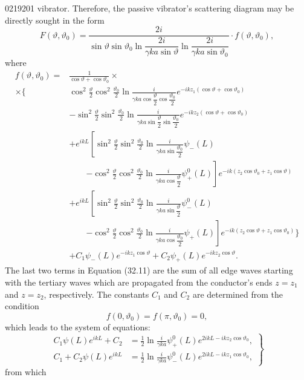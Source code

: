 \begin{scanpage}{0219}{201}
\noindent vibrator. Therefore, the passive vibrator's scattering diagram may be directly sought in the form
\[F(\vartheta,\vartheta_0)=\frac{2i}{\sin\vartheta\sin\vartheta_0\ln\dfrac{2i}{\gamma ka\sin\vartheta}\ln\dfrac{2i}{\gamma ka\sin\vartheta_0}}\cdot f(\vartheta,\vartheta_0),\tag{32.10}\]
where
\[\begin{aligned}
f(\vartheta,\vartheta_0)={}&\frac1{\cos\vartheta+\cos\vartheta_0}\times\\
\times\Biggl\{&\cos^2\frac\vartheta2\cos^2\frac{\vartheta_0}2\ln\frac{i}{\gamma ka\cos\dfrac\vartheta2\cos\dfrac{\vartheta_0}2}e^{-ikz_1(\cos\vartheta+\cos\vartheta_0)}\\
&-\sin^2\frac\vartheta2\sin^2\frac{\vartheta_0}2\ln\frac{i}{\gamma ka\sin\dfrac\vartheta2\sin\dfrac{\vartheta_0}2}e^{-ikz_2(\cos\vartheta+\cos\vartheta_0)}\\
&+e^{ikL}\left[\sin^2\frac\vartheta2\sin^2\frac{\vartheta_0}2\ln\frac{i}{\gamma ka\sin\dfrac{\vartheta_0}2}\psi_-(L)\right.\\
&\qquad\left.-\cos^2\frac\vartheta2\cos^2\frac{\vartheta_0}2\ln\frac{i}{\gamma ka\cos\dfrac\vartheta2}\psi_+^0(L)\right]e^{-ik(z_2\cos\vartheta_0+z_1\cos\vartheta)}\\
&+e^{ikL}\left[\sin^2\frac\vartheta2\sin^2\frac{\vartheta_0}2\ln\frac{i}{\gamma ka\sin\dfrac\vartheta2}\psi_-^0(L)\right.\\
&\qquad\left.-\cos^2\frac\vartheta2\cos^2\frac{\vartheta_0}2\ln\frac{i}{\gamma ka\cos\dfrac{\vartheta_0}2}\psi_+(L)\right]e^{-ik(z_2\cos\vartheta+z_1\cos\vartheta_0)}\Biggr\}\\
&+C_1\psi_-(L)e^{-ikz_1\cos\vartheta}+C_2\psi_+(L)e^{-ikz_2\cos\vartheta}.
\end{aligned}\tag{32.11}\]
The last two terms in Equation (32.11) are the sum of all edge waves starting with the tertiary waves which are propagated from the conductor's ends $z=z_1$ and $z=z_2$, respectively. The constants $C_1$ and $C_2$ are determined from the condition
\[f(0,\vartheta_0)=f(\pi,\vartheta_0)=0,\tag{32.12}\]
which leads to the system of equations:
\[\left.\begin{aligned}
C_1\psi(L)e^{ikL}+C_2&=\frac12\ln\frac{i}{\gamma ka}\psi_+^0(L)e^{2ikL-ikz_2\cos\vartheta_0},\\
C_1+C_2\psi(L)e^{ikL}&=\frac12\ln\frac{i}{\gamma ka}\psi_-^0(L)e^{2ikL-ikz_1\cos\vartheta_0},
\end{aligned}\right\}\tag{32.13}\]
from which
\end{scanpage}
